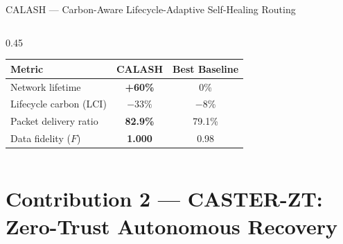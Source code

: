 \documentclass[aspectratio=169, 11pt]{beamer}
\begin{document}
\begin{frame}{CALASH — Carbon-Aware Lifecycle-Adaptive Self-Healing Routing}
\begin{columns}[T]
\begin{column}{0.45\textwidth}
  \vspace{6pt}
  \begin{table}[h]
    \centering
    \scriptsize
    \begin{tabular}{lcc}
      \toprule
      \textbf{Metric} & \textbf{CALASH} & \textbf{Best Baseline}\\
      \midrule
      Network lifetime & \cellcolor{polygreen!20}\textbf{+60\%} & 0\% \\
      Lifecycle carbon (LCI) & \cellcolor{polygreen!20}\textbf{$-33\%$} & $-$8\% \\
      Packet delivery ratio & \textbf{82.9\%} & 79.1\% \\
      Data fidelity ($F$) & \textbf{1.000} & 0.98 \\
      \bottomrule
    \end{tabular}
  \end{table}

\end{column}
\end{columns}

\vspace{2pt}

\end{frame}

\section{Contribution 2 — CASTER-ZT: Zero-Trust Autonomous Recovery}
\end{document}
